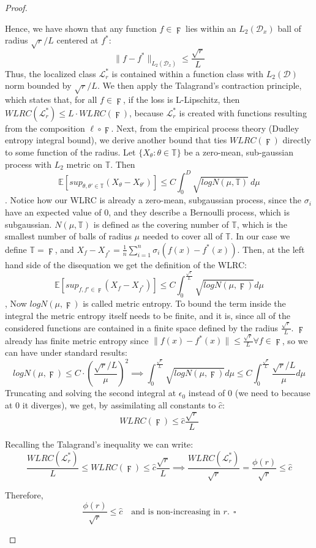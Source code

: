 \documentclass{article}
\newtheorem{proof}{Proof}
\begin{document}
\begin{proof}
\begin{enumerate}
    
    Hence, we have shown that any function \( f \in \digamma \) lies within an \( L_2(\mathcal{D}_x) \) ball of radius \( \sqrt{r}/L \) centered at \( f^* \):
    \[
    \|f - f^*\|_{L_2(\mathcal{D}_x)} \leq \frac{\sqrt{r}}{L}
    \]
    Thus, the localized class $\mathcal{L}_r^*$ is contained within a function class with $L_2(\mathcal{D})$ norm bounded by $\sqrt{r}/L$. We then apply the Talagrand's contraction principle, which states that, for all $f \in \digamma$, if the loss is L-Lipschitz, then $WLRC(\mathcal{L}_r^*) \leq L \cdot  WLRC(\digamma)$, because $\mathcal{L}_r^*$ is created with functions resulting from the composition $\ell \circ \digamma$.
    Next, from the empirical process theory (Dudley entropy integral bound), we derive another bound that ties $WLRC(\digamma)$ directly to some function of the radius.
    Let $\{X_\theta : \theta \in \mathbb{T}\}$ be a zero-mean, sub-gaussian process with $L_2$ metric on $\mathbb{T}$. Then \[
    \mathbb{E}[sup_{\theta, \theta' \in \mathbb{T}}(X_\theta - X_{\theta'})] \leq C \int_{0}^{D} \sqrt{logN(\mu,\mathbb{T})}\ d\mu
    \].
    Notice how our WLRC is already a zero-mean, subgaussian process, since the $\sigma_i$ have an expected value of $0$, and they  describe a Bernoulli process, which is subgaussian.
    $N(\mu,\mathbb{T})$ is defined as the covering number of $\mathbb{T}$, which is the smallest number of balls of radius $\mu$ needed to cover all of $\mathbb{T}$.
    In our case we define $\mathbb{T}=\digamma$, and $X_f-X_{f^*}= \frac{1}{n}\sum_{i=1}^n \sigma_i (f(x)-f^*(x))$. Then, at the left hand side of the disequation we get the definition of the WLRC: \[
    \mathbb{E}[sup_{f, f' \in \digamma}(X_f - X_{f^*})] \leq C \int_{0}^{\frac{\sqrt{r}}{L}}\sqrt{logN(\mu,\digamma)}d\mu
    \],
    Now $logN(\mu,\digamma)$ is called metric entropy. To bound the term inside the integral the metric entropy itself needs to be finite, and it is, since all of the considered functions are contained in a finite space defined by the radius $\frac{\sqrt{r}}{L}$.
    $\digamma$ already has finite metric entropy since $\|f(x)-f^*(x)\| \leq \frac{\sqrt{r}}{L} \forall f \in \digamma$, so we can have under standard results:
    \[
    logN(\mu, \digamma) \leq C \cdot (\frac{\sqrt{r}/L}{\mu})^2 \implies
    \int_{0}^{\frac{\sqrt{r}}{L}}\sqrt{logN(\mu,\digamma)}d\mu \leq C \int_{0}^{\frac{\sqrt{r}}{L}} \frac{\sqrt{r}/L}{\mu}d\mu
    \]
    Truncating and solving the second integral at $\epsilon_0$ instead of $0$ (we need to because at $0$ it diverges), we get, by assimilating all constants to $\hat{c}$:\[
    WLRC(\digamma) \leq \hat{c} \frac{\sqrt{r}}{L}
    \]

    
    Recalling the Talagrand's inequality we can write:
    \[
    \frac{WLRC(\mathcal{L}_r^*)}{L} \leq WLRC(\digamma) \leq \hat{c} \frac{\sqrt{r}}{L} \implies \frac{WLRC(\mathcal{L}_r^*)}{\sqrt{r}} = \frac{\phi(r)}{\sqrt{r}} \leq \hat{c}
    \]
    
    Therefore,
    \[
    \frac{\phi(r)}{\sqrt{r}} \leq \hat{c} \quad \text{and is non-increasing in } r. \ \ \square
    \]
\end{enumerate}

\end{proof}
\end{document}
